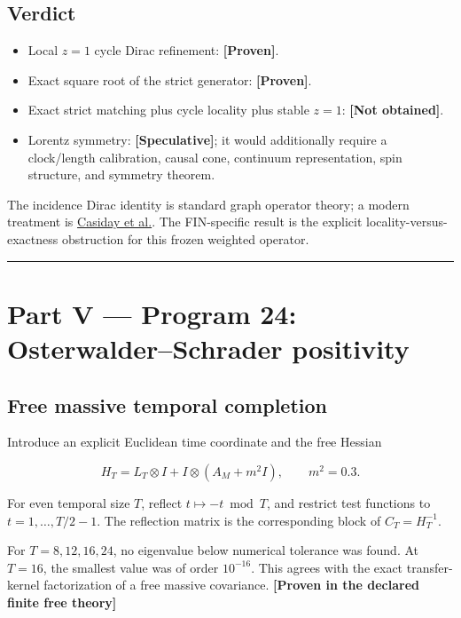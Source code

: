 \documentclass[11pt,a4paper,openany]{report}
\newcommand{\statusProven}{\textcolor{fingreen}{[Proven]}}
\newcommand{\statusSpeculative}{\textcolor{finorange}{[Speculative]}}
\begin{document}
\section{Verdict}

\begin{itemize}
\item 
Local \(z=1\) cycle Dirac refinement: \textbf{\statusProven{}}.

\item 
Exact square root of the strict generator: \textbf{\statusProven{}}.

\item 
Exact strict matching plus cycle locality plus stable \(z=1\): \textbf{[Not obtained]}.

\item 
Lorentz symmetry: \textbf{\statusSpeculative{}}; it would additionally require a clock/\allowbreak{}length calibration, causal cone, continuum representation, spin structure, and symmetry theorem.

\end{itemize}

The incidence Dirac identity is standard graph operator theory; a modern treatment is \href{https://doi.org/10.1080/03081087.2022.2158297}{Casiday et al.}. The FIN-specific result is the explicit locality-versus-exactness obstruction for this frozen weighted operator.

\par\medskip\hrule\medskip

\chapter{Part V — Program 24: Osterwalder–Schrader positivity}

\section{Free massive temporal completion}

Introduce an explicit Euclidean time coordinate and the free Hessian

\[
H_T=L_T\otimes I+I\otimes(A_M+m^2I),
\qquad m^2=0.3.
\]

For even temporal size \(T\), reflect \(t\mapsto-t\bmod T\), and restrict test functions to \(t=1,\ldots,T/2-1\). The reflection matrix is the corresponding block of \(C_T=H_T^{-1}\).

For \(T=8,12,16,24\), no eigenvalue below numerical tolerance was found. At \(T=16\), the smallest value was of order \(10^{-16}\). This agrees with the exact transfer-kernel factorization of a free massive covariance. \textbf{[Proven in the declared finite free theory]}
\end{document}
